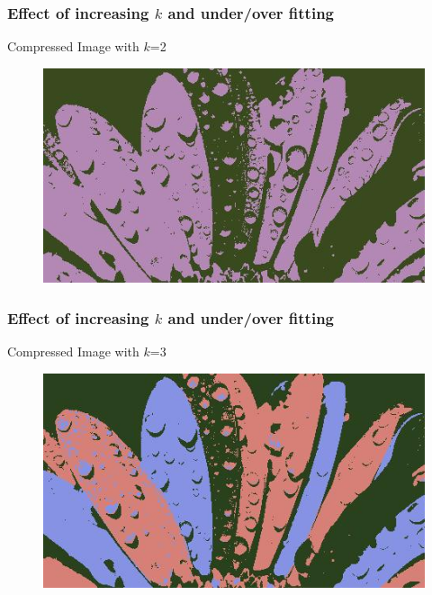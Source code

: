 \documentclass{beamer}
\begin{document}
\begin{frame}
\frametitle{Effect of increasing $k$ and under/over fitting}
\begin{center}
Compressed Image with $k$=2
\end{center}
\begin{figure}
\includegraphics[scale=0.7]{flower_compressed_2.jpg}
\end{figure}
\end{frame}

\begin{frame}
\frametitle{Effect of increasing $k$ and under/over fitting}
\begin{center}
Compressed Image with $k$=3
\end{center}
\begin{figure}
\includegraphics[scale=0.7]{flower_compressed_3.jpg}
\end{figure}
\end{frame}
\end{document}
